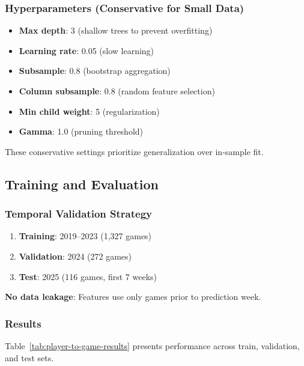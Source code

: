 \subsubsection{Hyperparameters (Conservative for Small Data)}

\begin{itemize}
    \item \textbf{Max depth}: 3 (shallow trees to prevent overfitting)
    \item \textbf{Learning rate}: 0.05 (slow learning)
    \item \textbf{Subsample}: 0.8 (bootstrap aggregation)
    \item \textbf{Column subsample}: 0.8 (random feature selection)
    \item \textbf{Min child weight}: 5 (regularization)
    \item \textbf{Gamma}: 1.0 (pruning threshold)
\end{itemize}

These conservative settings prioritize generalization over in-sample fit.

\subsection{Training and Evaluation}

\subsubsection{Temporal Validation Strategy}

\begin{enumerate}
    \item \textbf{Training}: 2019--2023 (1,327 games)
    \item \textbf{Validation}: 2024 (272 games)
    \item \textbf{Test}: 2025 (116 games, first 7 weeks)
\end{enumerate}

\textbf{No data leakage}: Features use only games prior to prediction week.

\subsubsection{Results}

Table~\ref{tab:player-to-game-results} presents performance across train, validation, and test sets.

